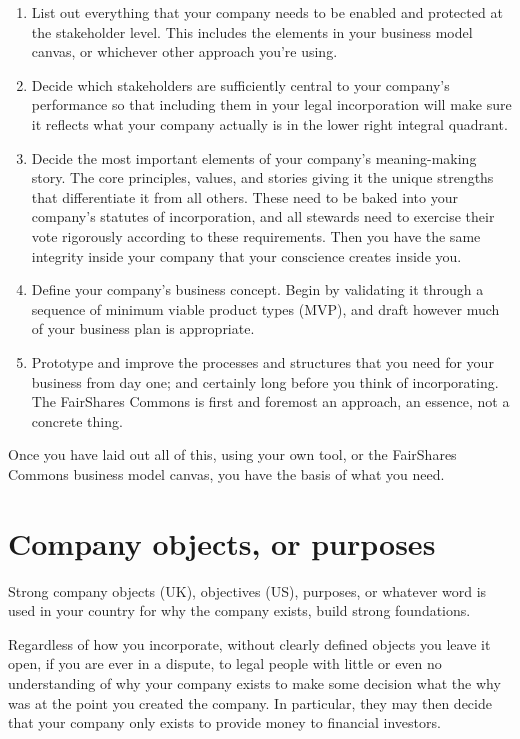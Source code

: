 \begin{enumerate}
\item List out everything that your company needs to be enabled and protected at the stakeholder level. This includes the elements in your business model canvas, or whichever other approach you're using.


\item Decide which stakeholders are sufficiently central to your company’s performance so that including them in your legal incorporation will make sure it reflects what your company actually is in the lower right integral quadrant.


\item Decide the most important elements of your company's meaning\hyp{}making story. The core principles, values, and stories giving it the unique strengths that differentiate it from all others. These need to be baked into your company's statutes of incorporation, and all stewards need to exercise their vote rigorously according to these requirements. Then you have the same integrity inside your company that your conscience creates inside you.


\item Define your company's business concept. Begin by validating it through a sequence of minimum viable product types (MVP), and draft however much of your business plan is appropriate.


\item Prototype and improve the processes and structures that you need for your business from day one; and certainly long before you think of incorporating. The FairShares Commons is first and foremost an approach, an essence, not a concrete thing.
\end{enumerate}


Once you have laid out all of this, using your own tool, or the FairShares Commons business model canvas, you have the basis of what you need.


\section{Company objects, or purposes}
Strong company objects (UK), objectives (US), purposes, or whatever word is used in your country for why the company exists, build strong foundations.


Regardless of how you incorporate, without clearly defined objects you leave it open, if you are ever in a dispute, to legal people with little or even no understanding of why your company exists to make some decision what the why was at the point you created the company. In particular, they may then decide that your company only exists to provide money to financial investors.


